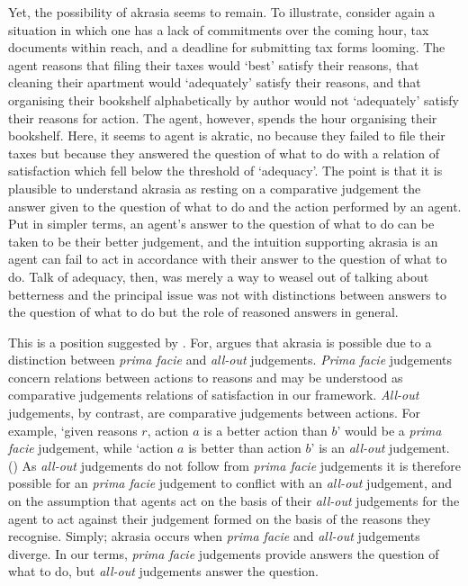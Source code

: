 \documentclass[10pt]{article}
\begin{document}
Yet, the possibility of akrasia seems to remain.
To illustrate, consider again a situation in which one has a lack of commitments over the coming hour, tax documents within reach, and a deadline for submitting tax forms looming.
The agent reasons that filing their taxes would `best' satisfy their reasons, that cleaning their apartment would `adequately' satisfy their reasons, and that organising their bookshelf alphabetically by author would not `adequately' satisfy their reasons for action.
The agent, however, spends the hour organising their bookshelf.
Here, it seems to agent is akratic, no because they failed to file their taxes but because they answered the question of what to do with a relation of satisfaction which fell below the threshold of `adequacy'.
The point is that it is plausible to understand akrasia as resting on a comparative judgement the answer given to the question of what to do and the action performed by an agent.
Put in simpler terms, an agent's answer to the question of what to do can be taken to be their better judgement, and the intuition supporting akrasia is an agent can fail to act in accordance with their answer to the question of what to do.
Talk of adequacy, then, was merely a way to weasel out of talking about betterness and the principal issue was not with distinctions between answers to the question of what to do but the role of reasoned answers in general.

This is a position suggested by \textcite{Davidson:1969aa}.
For, \citeauthor{Davidson:1969aa} argues that akrasia is possible due to a distinction between \emph{prima facie} and \emph{all-out} judgements.
\emph{Prima facie} judgements concern relations between actions to reasons and may be understood as comparative judgements relations of satisfaction in our framework.
\emph{All-out} judgements, by contrast, are comparative judgements between actions.
For example, `given reasons \(r\), action \(a\) is a better action than \(b\)' would be a \emph{prima facie} judgement, while `action \(a\) is better than action \(b\)' is an \emph{all-out} judgement.
(\citeyear[37--39]{Davidson:1969aa})
As \emph{all-out} judgements do not follow from \emph{prima facie} judgements it is therefore possible for an \emph{prima facie} judgement to conflict with an \emph{all-out} judgement, and on the assumption that agents act on the basis of their \emph{all-out} judgements for the agent to act against their judgement formed on the basis of the reasons they recognise.
Simply; akrasia occurs when \emph{prima facie} and \emph{all-out} judgements diverge.
In our terms, \emph{prima facie} judgements provide answers the question of what to do, but \emph{all-out} judgements answer the question.
\end{document}
